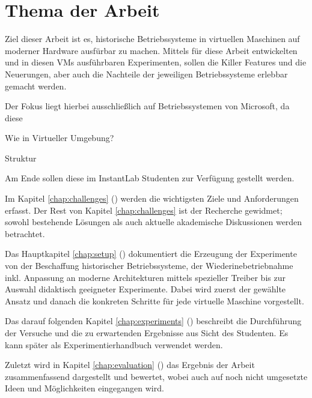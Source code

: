 		

\section{Thema der Arbeit}
\label{sec:topic}
				


		Ziel dieser Arbeit ist es, historische Betriebssysteme in virtuellen Maschinen auf moderner Hardware ausfürbar zu machen.
		Mittels für diese Arbeit entwickelten und in diesen VMs ausführbaren Experimenten, sollen die Killer Features und die Neuerungen, aber auch die Nachteile der jeweiligen Betriebssysteme erlebbar gemacht werden.

		Der Fokus liegt hierbei ausschließlich auf Betriebssystemen von Microsoft, da diese 

		
		Wie in Virtueller Umgebung?
		
		Struktur

		Am Ende sollen diese im InstantLab Studenten zur Verfügung gestellt werden.



		
		Im Kapitel \ref{chap:challenges} () werden die wichtigsten Ziele und Anforderungen erfasst. 
		Der Rest von Kapitel \ref{chap:challenges} ist der Recherche gewidmet; sowohl bestehende Lösungen als auch aktuelle akademische Diskussionen werden betrachtet.
		
		Das Hauptkapitel \ref{chap:setup} () dokumentiert die Erzeugung der Experimente von der Beschaffung historischer Betriebssysteme, der Wiederinebetriebnahme inkl. Anpassung an moderne Architekturen mittels spezieller Treiber bis zur Auswahl didaktisch geeigneter Experimente.
		Dabei wird zuerst der gewählte Ansatz und danach die konkreten Schritte für jede virtuelle Maschine vorgestellt.
		
		Das darauf folgenden Kapitel \ref{chap:experiments} () beschreibt die Durchführung der Versuche und die zu erwartenden Ergebnisse aus Sicht des Studenten. Es kann später als Experimentierhandbuch verwendet werden.

		Zuletzt wird in Kapitel \ref{chap:evaluation} () das Ergebnis der Arbeit zusammenfassend dargestellt und bewertet, wobei auch auf noch nicht umgesetzte Ideen und Möglichkeiten eingegangen wird.
		

